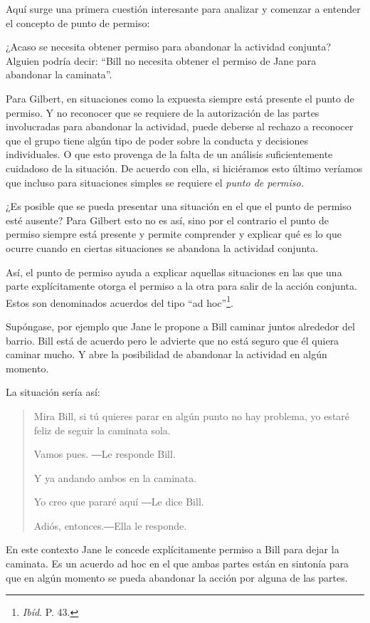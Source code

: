 \documentclass[oneside]{book}
\begin{document}
Aquí surge una primera cuestión interesante para analizar y comenzar a entender el concepto de punto de permiso: 

¿Acaso se necesita obtener permiso para abandonar la actividad conjunta? Alguien  podría decir: “Bill no necesita obtener el permiso de Jane para abandonar la caminata”.

Para Gilbert, en situaciones como la expuesta siempre está presente el punto de permiso. Y no reconocer que se requiere de la autorización de las partes involucradas para abandonar la actividad, puede deberse al rechazo a reconocer que el grupo tiene algún tipo de poder sobre la conducta y decisiones individuales. O que esto provenga de la falta de un análisis suficientemente cuidadoso de la situación. De acuerdo con ella, si hiciéramos esto último veríamos que incluso para situaciones simples se requiere el \textit{punto de permiso.}

¿Es posible que se pueda presentar una situación en el que el punto de permiso esté ausente? Para Gilbert esto no es así, sino por el contrario el punto de permiso siempre está presente y permite comprender y explicar qué es lo que ocurre cuando en ciertas situaciones se abandona la actividad conjunta. 

Así, el punto de permiso ayuda a explicar aquellas situaciones en las que una parte explícitamente otorga el permiso a la otra para salir de la acción conjunta. Estos son denominados acuerdos del tipo “ad hoc”\footnote{\textit{Ibíd}. P. 43.}.

Supóngase, por ejemplo que Jane le propone a Bill caminar juntos alrededor del barrio. Bill está de acuerdo pero le advierte que no está seguro que él quiera caminar mucho. Y abre la posibilidad de abandonar la actividad en algún momento.

La situación sería así:

\begin{quote}
Mira Bill, si tú quieres parar en algún punto no hay problema, yo estaré feliz de seguir la caminata sola. 

Vamos pues. ―Le responde Bill.

Y ya andando ambos en la caminata. 

Yo creo que pararé aquí ―Le dice Bill.

Adiós, entonces.―Ella le responde. 
\end{quote}

En este contexto Jane le concede explícitamente permiso a Bill para dejar la caminata. Es un acuerdo ad hoc en el que ambas partes están en sintonía para que en algún momento se pueda abandonar la acción por alguna de las partes.
\end{document}
